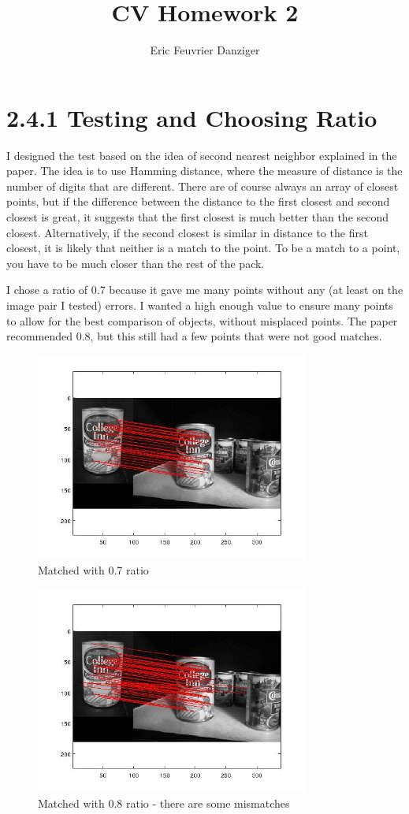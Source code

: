 \documentclass[11pt]{article}
\title{\textbf{CV Homework 2}}
\author{Eric Feuvrier Danziger\\
		}
\date{}
\begin{document}
\maketitle




\section*{2.4.1 Testing and Choosing Ratio}
I designed the test based on the idea of second nearest neighbor explained in the paper. The idea is to use Hamming distance, where the measure of distance is the number of digits that are different. There are of course always an array of closest points, but if the difference between the distance to the first closest and second closest is great, it suggests that the first closest is much better than the second closest. Alternatively, if the second closest is similar in distance to the first closest, it is likely that neither is a match to the point. To be a match to a point, you have to be much closer than the rest of the pack. 

I chose a ratio of 0.7 because it gave me many points without any (at least on the image pair I tested) errors. I wanted a high enough value to ensure many points to allow for the best comparison of objects, without misplaced points. The paper recommended 0.8, but this still had a few points that were not good matches. 
\begin{figure}[H]
\centering
\includegraphics[width=90mm]{ratiopoint7.jpg}
\caption{Matched with 0.7 ratio}
\end{figure}

\begin{figure}[H]
\centering
\includegraphics[width=90mm]{ratiopoint8.jpg}
\caption{Matched with 0.8 ratio - there are some mismatches}
\end{figure}
\end{document}
